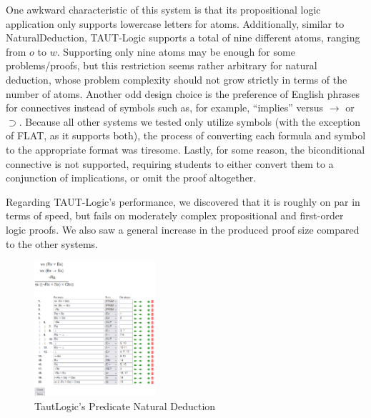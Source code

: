 \documentclass[ms]{uncgdissertationexp2}
\theoremstyle{plain}
\theoremstyle{definition}
\theoremstyle{remark}
\begin{document}
One awkward characteristic of this system is that its propositional logic application only supports lowercase letters for atoms. Additionally, similar to NaturalDeduction, TAUT-Logic supports a total of nine different atoms, ranging from $o$ to $w$. Supporting only nine atoms may be enough for some problems/proofs, but this restriction seems rather arbitrary for natural deduction, whose problem complexity should not grow strictly in terms of the number of atoms. Another odd design choice is the preference of English phrases for connectives instead of symbols such as, for example, ``implies'' versus $\to$ or $\supset$. Because all other systems we tested only utilize symbols (with the exception of FLAT, as it supports both), the process of converting each formula and symbol to the appropriate format was tiresome. Lastly, for some reason, the biconditional connective is not supported, requiring students to either convert them to a conjunction of implications, or omit the proof altogether. 
    
Regarding TAUT-Logic's performance, we discovered that it is roughly on par in terms of speed, but fails on moderately complex propositional and first-order logic proofs. We also saw a general increase in the produced proof size compared to the other systems. 
\begin{figure}[!ht]
	\centering
	\includegraphics[width=0.4\textwidth]{tautlogic.png}
	\caption{TautLogic's Predicate Natural Deduction}
	\label{fig:tautlogic}
\end{figure} 
\end{document}
